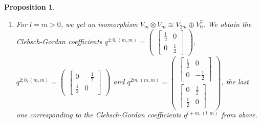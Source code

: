 \documentclass[12pt, a4paper]{article}
\theoremstyle{plain}
\newtheorem{pro}{Proposition}[section]
\theoremstyle{definition}
\theoremstyle{remark}
\begin{document}
\begin{pro}
\begin{enumerate}
\item For $l = m > 0$, we get an isomorphism $V_m \otimes V_m \cong V_{2m} \oplus V_0^2$. We obtain the Clebsch-Gordan coefficients $q^{1; 0,(m,m)} = \begin{pmatrix} \begin{bmatrix} \frac{1}{2} & 0 \\ 0 & \frac{1}{2} \end{bmatrix}\end{pmatrix}$,  $q^{2; 0,(m,m)} = \begin{pmatrix} \begin{bmatrix} 0 & - \frac{1}{2} \\ \frac{1}{2} & 0\end{bmatrix} \end{pmatrix}$ and $q^{2m,(m,m)} = \begin{pmatrix}\begin{bmatrix} \frac{1}{2} & 0 \\ 0 & -\frac{1}{2}\end{bmatrix} \\ \begin{bmatrix} 0 & \frac{1}{2} \\ \frac{1}{2} & 0\end{bmatrix} \end{pmatrix}$, the last one corresponding to the Clebsch-Gordan coefficients $q^{l+m,(l,m)}$ from above.
\end{enumerate}
\end{pro}
\end{document}
